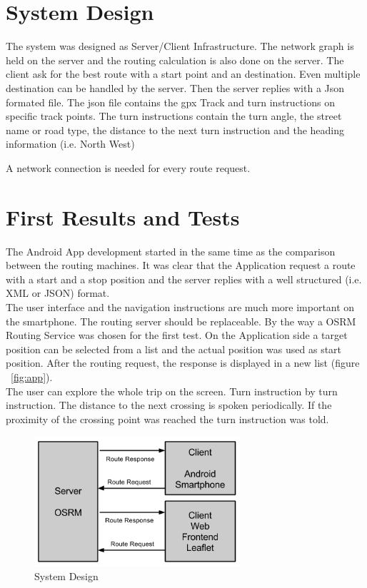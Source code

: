 \documentclass{sig-alternate}
\begin{document}


\section{System Design}
The system was designed as Server/Client Infrastructure. The network graph is held on the server and the routing calculation is also done on the server.  The client ask for the best route with a start point and an destination. Even multiple destination can be handled by the server. Then the server replies with a Json formated file. The json file contains the gpx Track and turn instructions on specific track points. The turn instructions contain the turn angle, the street name or road type, the distance to the next turn instruction and the heading information (i.e. North West) 

A network connection is needed for every route request. 

\section{First Results and Tests}
The Android App development started in the same time as the comparison between the routing machines. It was clear that the Application request a route with a start and a stop position and the server replies with a well structured (i.e. XML or JSON) format. \\
The user interface and the navigation instructions are much more important on the smartphone. The routing server should be replaceable. 
By the way a OSRM Routing Service was chosen for the first test. On the Application side a target position can be selected from a list and the actual position was used as start position. After the routing request, the response is displayed in a new list (figure ~\ref{fig:app}). \\
The user can explore the whole trip on the screen. Turn instruction by turn instruction. The distance to the next crossing is spoken periodically. If the proximity of the crossing point was reached the turn instruction was told. \\


 

\begin{figure}
\centering
\includegraphics[width=3in]{System-Design2.png}
\caption{System Design}
\end{figure}
\end{document}
